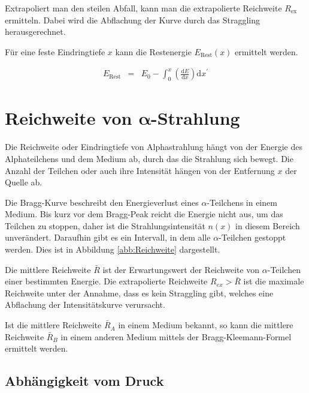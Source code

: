 \documentclass[12pt,a4paper]{scrartcl}
\numberwithin{equation}{section} %
\renewcommand{\[}{} %
\renewcommand{\]}{\noindent} %
\begin{document}
Extrapoliert man den steilen Abfall, kann man die extrapolierte
Reichweite \(R_\mathrm{ex}\) ermitteln. Dabei wird die Abflachung der
Kurve durch das Straggling herausgerechnet.

Für eine feste Eindringtiefe \(x\) kann die Restenergie
\(E_\mathrm{Rest}(x)\) ermittelt werden.

\[
\begin{eqnarray}
        E_\mathrm{Rest}
                &=& E_0
                - \int_0^x \left(\frac{\mathrm dE}{\mathrm dx}\right) \mathrm dx^\prime
\end{eqnarray}
\]

\hypertarget{reichweite-von-pmbalpha-strahlung}{%
\section{\texorpdfstring{Reichweite von
\(\pmb{\alpha}\)-Strahlung}{Reichweite von \textbackslash pmb\{\textbackslash alpha\}-Strahlung}}\label{reichweite-von-pmbalpha-strahlung}}

Die Reichweite oder Eindringtiefe von Alphastrahlung hängt von der
Energie des Alphateilchens und dem Medium ab, durch das die Strahlung
sich bewegt. Die Anzahl der Teilchen oder auch ihre Intensität hängen
von der Entfernung \(x\) der Quelle ab.

Die Bragg-Kurve beschreibt den Energieverlust eines \(\alpha\)-Teilchens
in einem Medium. Bis kurz vor dem Bragg-Peak reicht die Energie nicht
aus, um das Teilchen zu stoppen, daher ist die Strahlungsintensität
\(n(x)\) in diesem Bereich unverändert. Daraufhin gibt es ein Intervall,
in dem alle \(\alpha\)-Teilchen gestoppt werden. Dies ist in Abbildung \ref{abb:Reichweite} dargestellt.

Die mittlere Reichweite \(\bar R\) ist der Erwartungswert der Reichweite
von \(\alpha\)-Teilchen einer bestimmten Energie. Die extrapolierte
Reichweite \(R_{ex}>\bar R\) ist die maximale Reichweite unter der
Annahme, dass es kein Straggling gibt, welches eine Abflachung der
Intensitätskurve verursacht.

Ist die mittlere Reichweite \(\bar R_A\) in einem Medium bekannt, so
kann die mittlere Reichweite \(\bar R_B\) in einem anderen Medium
mittels der Bragg-Kleemann-Formel ermittelt werden.

\hypertarget{abhuxe4ngigkeit-vom-druck}{%
\subsection{Abhängigkeit vom Druck}\label{abhuxe4ngigkeit-vom-druck}}
\end{document}
